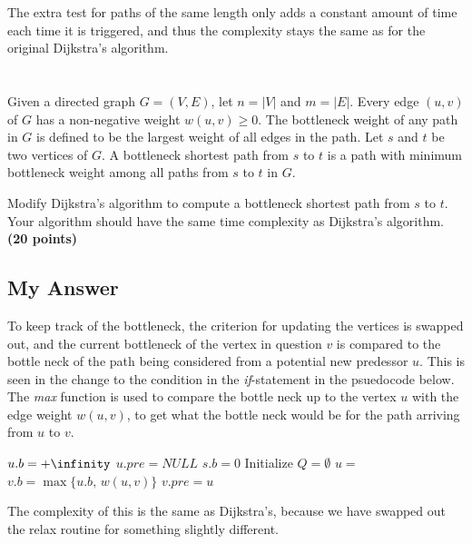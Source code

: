 \documentclass{article}
\begin{document}
The extra test for paths of the same length only adds a constant
amount of time each time it is triggered, and thus the complexity
stays the same as for the original Dijkstra's algorithm.




\section{} %

 Given a directed graph $G = (V,E)$, let $n = |V |$ and $m =
 |E|$. Every edge $(u,v)$ of $G$ has a non-negative weight $w(u,v) \ge
 0$. The bottleneck weight of any path in $G$ is defined to be the
 largest weight of all edges in the path. Let $s$ and $t$ be two
 vertices of $G$. A bottleneck shortest path from $s$ to $t$ is a path
 with minimum bottleneck weight among all paths from $s$ to $t$ in $G$.

Modify Dijkstra's algorithm to compute a bottleneck shortest path from
$s$ to $t$. Your algorithm should have the same time complexity as
Dijkstra's algorithm. {\bf (20 points)}

\subsection{My Answer}
To keep track of the bottleneck, the criterion for updating the
vertices is swapped out, and the current bottleneck of the vertex in
question $v$ is compared to the bottle neck of the path being considered
from a potential new predessor $u$.  This is seen in the change to the
condition in the \emph{if}-statement in the psuedocode below.  The
\emph{max} function is used to compare the bottle neck up to the
vertex $u$ with the edge weight $w(u,v)$, to get what the bottle neck
would be for the path arriving from $u$ to $v$.

{\singlespacing
\begin{algorithmic}
      \State $u.b = +\infinity$
      \State $u.pre = NULL$
    \EndFor
    \State $s.b = 0$
    \State Initialize $Q = \emptyset$
        \State $u = $ 
            \State $v.b = \max\{u.b,\, w(u,v)\}$
            \State $v.pre = u$
          \EndIf  
        \EndFor
    \EndWhile
\EndFunction    
\end{algorithmic}
}

The complexity of this is the same as Dijkstra's, because we have
swapped out the relax routine for something slightly different.
\end{document}
